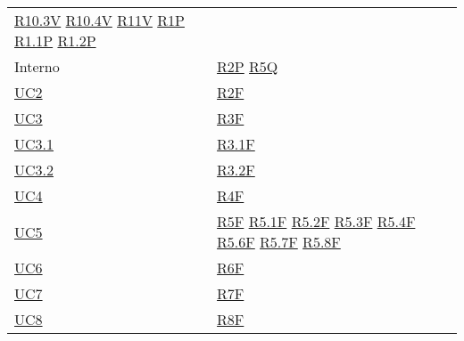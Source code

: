 \begin{center}
\begin{longtable}[!h]{m{50px} m{50px}}
        \newline \hyperref[tab:RequisitiVincolo]{R10.3V}
        \newline \hyperref[tab:RequisitiVincolo]{R10.4V}
        \newline \hyperref[tab:RequisitiVincolo]{R11V}
        \newline \hyperref[tab:RequisitiPrestazionali]{R1P}
        \newline \hyperref[tab:RequisitiPrestazionali]{R1.1P}
        \newline \hyperref[tab:RequisitiPrestazionali]{R1.2P}                          \\

        Interno                           & \hyperref[tab:RequisitiPrestazionali]{R2P}
        \newline \hyperref[tab:RequisitiQualita]{R5Q}                                  \\

        \hyperref[sec:UC2]{UC2}           & \hyperref[tab:RequisitiFunzionali]{R2F}    \\
        \hyperref[sec:UC3]{UC3}           & \hyperref[tab:RequisitiFunzionali]{R3F}    \\
        \hyperref[sec:UC3.1]{UC3.1}       & \hyperref[tab:RequisitiFunzionali]{R3.1F}  \\
        \hyperref[sec:UC3.2]{UC3.2}       & \hyperref[tab:RequisitiFunzionali]{R3.2F}  \\
        \hyperref[sec:UC4]{UC4}           & \hyperref[tab:RequisitiFunzionali]{R4F}    \\

        \hyperref[sec:UC5]{UC5}           & \hyperref[tab:RequisitiFunzionali]{R5F}
        \newline \hyperref[tab:RequisitiFunzionali]{R5.1F}
        \newline \hyperref[tab:RequisitiFunzionali]{R5.2F}
        \newline \hyperref[tab:RequisitiFunzionali]{R5.3F}
        \newline \hyperref[tab:RequisitiFunzionali]{R5.4F}
        \newline \hyperref[tab:RequisitiFunzionali]{R5.6F}
        \newline \hyperref[tab:RequisitiFunzionali]{R5.7F}
        \newline \hyperref[tab:RequisitiFunzionali]{R5.8F}                             \\

        \hyperref[sec:UC6]{UC6}           & \hyperref[tab:RequisitiFunzionali]{R6F}    \\
        \hyperref[sec:UC7]{UC7}           & \hyperref[tab:RequisitiFunzionali]{R7F}    \\
        \hyperref[sec:UC8]{UC8}           & \hyperref[tab:RequisitiFunzionali]{R8F}    \\


\end{longtable}
\end{center}
